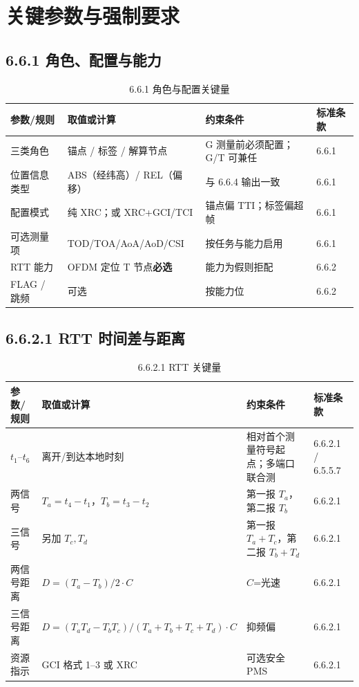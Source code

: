 \documentclass[11pt,a4paper]{ctexart}
\begin{document}
\section{关键参数与强制要求}

\subsection{6.6.1 角色、配置与能力}

\begin{longtable}{L{3.2cm}L{4cm}L{4.5cm}L{2cm}}
\caption{6.6.1 角色与配置关键量\label{tab:661-cfg}} \\
\toprule
\textbf{参数/规则} & \textbf{取值或计算} & \textbf{约束条件} & \textbf{标准条款} \\
\midrule
三类角色 & 锚点 / 标签 / 解算节点 & G 测量前必须配置；G/T 可兼任 & 6.6.1 \\
位置信息类型 & ABS（经纬高）/ REL（偏移） & 与 6.6.4 输出一致 & 6.6.1 \\
配置模式 & 纯 XRC；或 XRC+GCI/TCI & 锚点偏 TTI；标签偏超帧 & 6.6.1 \\
可选测量项 & TOD/TOA/AoA/AoD/CSI & 按任务与能力启用 & 6.6.1 \\
RTT 能力 & OFDM 定位 T 节点\textbf{必选} & 能力为假则拒配 & 6.6.2 \\
FLAG / 跳频 & 可选 & 按能力位 & 6.6.2 \\
\bottomrule
\end{longtable}

\subsection{6.6.2.1 RTT 时间差与距离}

\begin{longtable}{L{2.8cm}L{4.5cm}L{4.5cm}L{2cm}}
\caption{6.6.2.1 RTT 关键量\label{tab:6621-rtt}} \\
\toprule
\textbf{参数/规则} & \textbf{取值或计算} & \textbf{约束条件} & \textbf{标准条款} \\
\midrule
$t_1$--$t_6$ & 离开/到达本地时刻 & 相对首个测量符号起点；多端口联合测 & 6.6.2.1 / 6.5.5.7 \\
两信号 & $T_a{=}t_4{-}t_1$，$T_b{=}t_3{-}t_2$ & 第一报 $T_a$，第二报 $T_b$ & 6.6.2.1 \\
三信号 & 另加 $T_c,T_d$ & 第一报 $T_a{+}T_c$，第二报 $T_b{+}T_d$ & 6.6.2.1 \\
两信号距离 & $D=(T_a-T_b)/2\cdot C$ & $C$=光速 & 6.6.2.1 \\
三信号距离 & $D=(T_a T_d-T_b T_c)/(T_a+T_b+T_c+T_d)\cdot C$ & 抑频偏 & 6.6.2.1 \\
资源指示 & GCI 格式 1--3 或 XRC & 可选安全 PMS & 6.6.2.1 \\
\bottomrule
\end{longtable}
\end{document}
